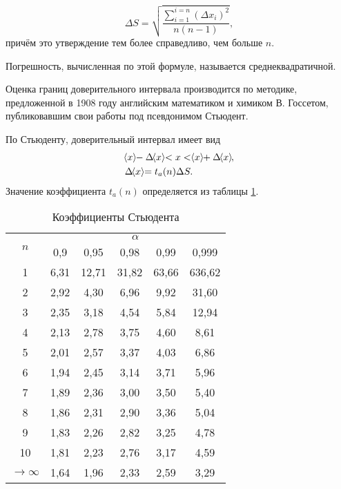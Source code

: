 \documentclass[a4paper, 12pt]{extarticle}
\newcommand{\nisum}{\sum\limits_{i=1}^{i=n}}
\begin{document}
\begin{equation}
\label{eq:mean-error}
\Delta S = \sqrt{\frac{\nisum \left(\Delta x_i \right)^2}{n (n - 1)}},
\end{equation}
причём это утверждение тем более справедливо, чем больше $n$.

Погрешность, вычисленная по этой формуле, называется среднеквадратичной.

Оценка границ доверительного интервала производится по методике, предложенной в 1908 году английским математиком и химиком В. Госсетом, публиковавшим свои работы под псевдонимом Стьюдент.

По Стьюденту, доверительный интервал имеет вид
\begin{align}
    \label{eq:student-s}
    &\MTDMean{x} - \Delta \MTDMean{x} < x < \MTDMean{x} + \Delta \MTDMean{x}, \\
    & \Delta  \MTDMean{x} = t_a(n)\Delta S.
\end{align}
Значение коэффициента $t_a(n)$ определяется из таблицы \ref{tab:student-s-coef}.
\begin{table}[t]
\caption{Коэффициенты Стьюдента \label{tab:student-s-coef}}
\begin{center}
\begin{tabular}{|c|c|c|c|c|c|}
\hline
\multirow{2}{*}{$n$} & \multicolumn{5}{|c|}{$\alpha$} \\ \cline{2-6}
   & 0,9 & 0,95 & 0,98 & 0,99 & 0,999 \\ \hline
1 & 6,31 & 12,71 &  31,82 &  63,66 & 636,62 \\ \hline
2 & 2,92 & 4,30  & 6,96 & 9,92 & 31,60 \\ \hline
3 & 2,35  & 3,18 & 4,54 & 5,84 & 12,94 \\ \hline
4 & 2,13 & 2,78 & 3,75 & 4,60 & 8,61 \\ \hline
5 & 2,01 & 2,57 & 3,37 & 4,03 & 6,86 \\ \hline
6 & 1,94 & 2,45 & 3,14 & 3,71 & 5,96 \\ \hline
7 & 1,89& 2,36 & 3,00 & 3,50 & 5,40 \\ \hline
8 &1,86 &2,31 &2,90 &3,36& 5,04 \\ \hline
9 &1,83 &2,26& 2,82 &3,25& 4,78  \\ \hline
10 &1,81 &2,23& 2,76 &3,17 &4,59  \\ \hline
$\to \infty$ &  1,64 & 1,96 & 2,33 &2,59 & 3,29 \\ \hline
\end{tabular}
\end{center}
\end{table}
\end{document}
